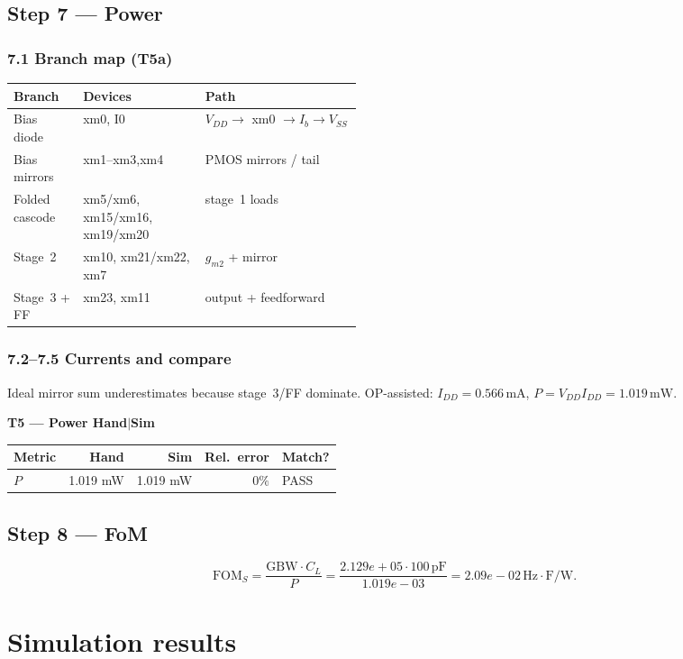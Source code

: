 \documentclass[11pt]{article}
\begin{document}
\subsection{Step 7 --- Power}
\subsubsection{7.1 Branch map (T5a)}
\begin{center}
{\small
\begin{tabular}{@{}llp{0.45\linewidth}@{}}
\toprule
Branch & Devices & Path \\
\midrule
Bias diode & xm0, I0 & $V_{DD}\to$ xm0 $\to I_b\to V_{SS}$ \\
Bias mirrors & xm1--xm3,xm4 & PMOS mirrors / tail \\
Folded cascode & xm5/xm6, xm15/xm16, xm19/xm20 & stage~1 loads \\
Stage~2 & xm10, xm21/xm22, xm7 & $g_{m2}$ + mirror \\
Stage~3 + FF & xm23, xm11 & output + feedforward \\
\bottomrule
\end{tabular}}
\end{center}
\subsubsection{7.2--7.5 Currents and compare}
Ideal mirror sum underestimates because stage~3/FF dominate.
OP-assisted: $I_{DD}{=}0.566\,\mathrm{mA}$,
$P{=}V_{DD}I_{DD}{=}1.019\,\mathrm{mW}$.

\textbf{T5 --- Power Hand$|$Sim}
\begin{center}
{\small
\begin{tabular}{@{}lrrrl@{}}
\toprule
Metric & Hand & Sim & Rel.\ error & Match? \\
\midrule
$P$ & 1.019 mW & 1.019 mW & $0\%$ & PASS \\
\bottomrule
\end{tabular}}
\end{center}

\subsection{Step 8 --- FoM}
\[
\mathrm{FOM}_S = \frac{\mathrm{GBW}\cdot C_L}{P}
 = \frac{2.129e+05\cdot 100\,\mathrm{pF}}{1.019e-03}
 = 2.09e-02\,\mathrm{Hz\cdot F/W}.
\]

\section{Simulation results}
\end{document}
